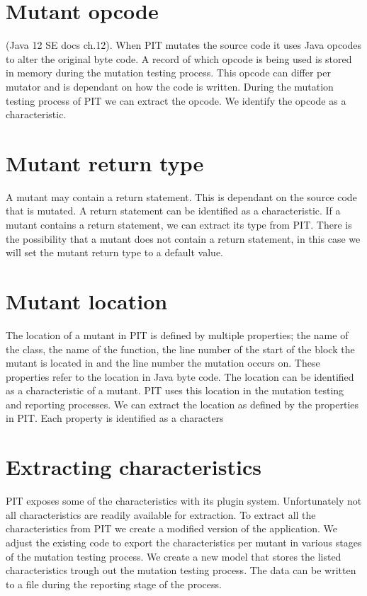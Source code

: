 \documentclass[../main]{subfiles}
\begin{document}
\section{Mutant opcode}
 (Java 12 SE docs ch.12).
When PIT mutates the source code it uses Java opcodes to alter the original byte code. 
A record of which opcode is being used is stored in memory during the mutation testing process. 
This opcode can differ per mutator and is dependant on how the code is written.
During the mutation testing process of PIT we can extract the opcode.
We identify the opcode as a characteristic.

\section{Mutant return type}
A mutant may contain a return statement. 
This is dependant on the source code that is mutated.
A return statement can be identified as a characteristic.
If a mutant contains a return statement, we can extract its type from PIT.
There is the possibility that a mutant does not contain a return statement, in this case we will set the mutant return type to a default value.

\section{Mutant location}
The location of a mutant in PIT is defined by multiple properties;
the name of the class, the name of the function, the line number of the start of the block the mutant is located in and the line number the mutation occurs on.
These properties refer to the location in Java byte code.
The location can be identified as a characteristic of a mutant.
PIT uses this location in the mutation testing and reporting processes.
We can extract the location as defined by the properties in PIT.
Each property is identified as a characters

\section{Extracting characteristics}
PIT exposes some of the characteristics with its plugin system.
Unfortunately not all characteristics are readily available for extraction.
To extract all the characteristics from PIT we create a modified version of the application.
We adjust the existing code to export the characteristics per mutant in various stages of the mutation testing process.
We create a new model that stores the listed characteristics trough out the mutation testing process. 
The data can be written to a file during the reporting stage of the process. 
\end{document}
